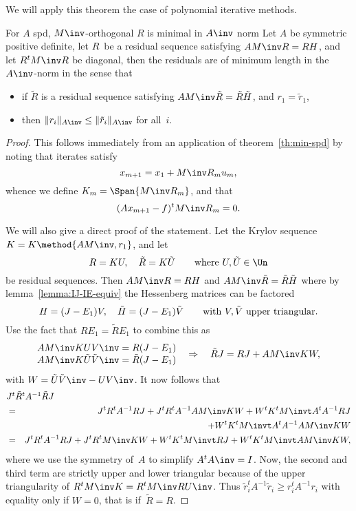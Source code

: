 We will apply this theorem the case of polynomial iterative methods.

\begin{ccorollary}{For $A$ spd, $M\inv$-orthogonal $R$ 
is minimal in $A\inv$ norm}
\label{minimum:A-1}
Let $A$ be symmetric positive definite, let $R$~be a residual sequence
satisfying $AM\inv R=RH$, and let $R^tM\inv R$ be diagonal,
then the residuals
are of minimum length in the $A\inv$-norm in the sense that
\begin{itemize}
\item if $\tilde R$ is a residual sequence satisfying
$AM\inv\tilde R=\tilde R\tilde H$, and $r_1=\tilde r_1$,
\item then $\|r_i\|_{A\inv}\leq\|\tilde r_i\|_{A\inv}$ for all~$i$.
\end{itemize}
\end{ccorollary}
\begin{proof}This follows immediately from an application
of theorem~\ref{th:min-spd} by noting that iterates satisfy
\[ x_{m+1} = x_1+M\inv R_mu_m, \] whence we define $K_m=\Span{M\inv R_m}$,
and that \[ (Ax_{m+1}-f)^tM\inv R_m = 0.\]

We will also give a direct proof of the statement.
Let the Krylov sequence $K=K\method{AM\inv,r_1}$,
and let 
 \[ R=KU,\quad\tilde R=K\tilde U \qquad\hbox{where $U,\tilde U\in \Un$} \]
be residual sequences.
Then $AM\inv R=RH$ and $AM\inv\tilde R=\tilde R\tilde H$ where 
by lemma~\ref{lemma:IJ-IE-equiv}
the Hessenberg matrices can be factored
 \[ H=(J-E_1)V,\quad \tilde H=(J-E_1)\tilde V
                \qquad\hbox{with $V,\tilde V$ upper triangular}. \]
Use the fact that $RE_1=\tilde RE_1$ to combine this as
 \[ \begin{matrix}AM\inv KUV\inv=R(J-E_1)\cr AM\inv K\tilde U\tilde V\inv
             =\tilde R(J-E_1)\cr\end{matrix}
    \quad\Rightarrow\quad \tilde RJ=RJ+AM\inv KW, \]
with $W=\tilde U\tilde V\inv -UV\inv$.
It now follows that
\begin{eqnarray*}
    \rlap{$J^t\tilde R^tA^{-1}\tilde RJ$}\\
    &=&J^tR^tA^{-1}RJ+
    J^tR^tA^{-1}AM\inv KW+W^tK^tM\invt A^tA^{-1}RJ\\
    &&+W^tK^tM\invt A^tA^{-1}AM\inv KW\\
    &=&J^tR^tA^{-1}RJ+
    J^tR^tM\inv KW + W^tK^tM\invt RJ+W^tK^tM\invt AM\inv KW,
\end{eqnarray*}
where we use the symmetry of~$A$ to simplify $A^tA\inv=I$.
Now, the second and third term are strictly upper and lower
triangular because of the upper triangularity
of $R^tM\inv K=R^tM\inv RU\inv$. 
Thus $\tilde r_i^tA^{-1}\tilde r_i\geq r_i^tA^{-1}r_i$ with equality
only if $W=0$, that is if~$\tilde R=R$.
\end{proof}

